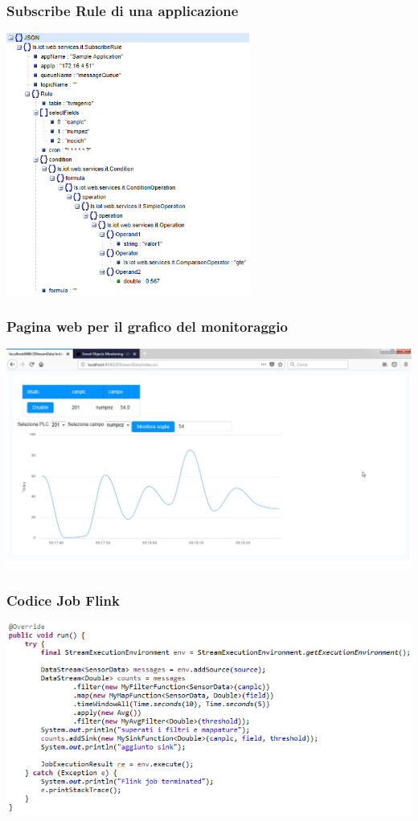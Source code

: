 \documentclass{beamer}
\begin{document}
\begin{frame}
\frametitle{Subscribe Rule di una applicazione}
\includegraphics[width=0.6\textwidth]{images/subscribe-json-1.png}
\end{frame}

\begin{frame}
\frametitle{Pagina web per il grafico del monitoraggio}
\includegraphics[width=1\textwidth]{images/grafico-zk.png}
\end{frame}

\begin{frame}
\frametitle{Codice Job Flink}
\includegraphics[width=1\textwidth]{images/flink-job.png}
\end{frame}
\end{document}
